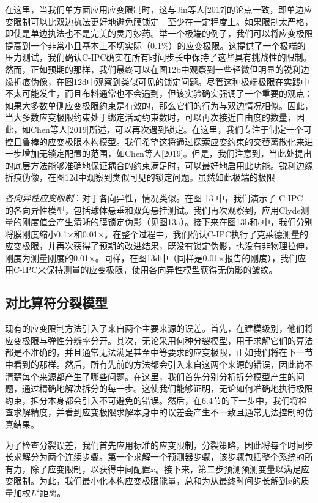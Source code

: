 在这里，当我们单方面应用应变限制时，这与Jin等人[2017]的论点一致，即单边应变限制可以比双边执法更好地避免膜锁定 - 至少在一定程度上。如果限制太严格，即使是单边执法也不是完美的灵丹妙药。举一个极端的例子，我们可以将应变极限提高到一个非常小且基本上不切实际（0.1\%）的应变极限。这提供了一个极端的压力测试，我们确认C-IPC确实在所有时间步长中保持了这些具有挑战性的限制。然而，正如预期的那样，我们最终可以在图12b中观察到一些轻微但明显的锐利边缘折痕伪像，在图12d中观察到类似可见的锁定问题。尽管这种极端极限在实践中不太可能发生，而且布料通常也不会遇到，但该实验确实强调了一个重要的观点：如果大多数单侧应变极限约束是有效的，那么它们的行为与双边情况相似。因此，当大多数应变极限约束处于绑定活动约束数时，可以再次接近自由度的数量，因此，如Chen等人[2019]所述，可以再次遇到锁定。在这里，我们专注于制定一个可控且鲁棒的应变极限本构模型。我们希望这将通过探索应变约束的交替离散化来进一步增加无锁定配置的范围，如Chen等人[2019]。但是，我们注意到，当此处提出的底层方法能够准确地保证耦合的约束满足时，可以最好地启用此功能。锐利边缘折痕伪像，在图12d中观察到类似可见的锁定问题。虽然如此极端的极限

\textit{各向异性应变限制}：对于各向异性，情况类似。在图 13 中，我们演示了 C-IPC 的各向异性模型，包括球体悬垂和双角悬挂测试。我们再次观察到，应用Clyde测量的刚度值会产生清晰的膜锁定伪影（见图13a）。接下来在图13b和c中，我们分别将膜刚度缩小0.1×和0.01×。在整个过程中，我们确认C-IPC执行了克莱德测量的应变极限，并再次获得了预期的改进结果，既没有锁定伪影，也没有非物理拉伸，刚度为测量刚度的0.01×。同样，在图13d中（同样是0.01×报告的刚度），我们应用C-IPC来保持测量的应变极限，使用各向异性模型获得无伪影的皱纹。

\subsection{对比算符分裂模型}

现有的应变限制方法引入了来自两个主要来源的误差。首先，在建模级别，他们将应变极限与弹性分辨率分开。其次，无论采用何种分裂模型，用于求解它们的算法都是不准确的，并且通常无法满足甚至中等要求的应变极限，正如我们将在下一节中看到的那样。然后，所有先前的方法都会引入来自这两个来源的错误，因此尚不清楚每个来源都产生了哪些问题。在这里，我们首先分别分析拆分模型产生的问题，通过精确地解决拆分的每一步。这使我们能够证明，无论如何准确地执行极限约束，拆分本身都会引入不可避免的错误。然后，在6.4节的下一步中，我们将检查求解精度，并看到应变极限求解本身中的误差会产生不一致且通常无法控制的仿真结果。

为了检查分裂误差，我们首先应用标准的应变限制，分裂策略，因此将每个时间步长求解分为两个连续步骤。第一个求解一个预测器步骤，该步骤包括整个系统的所有力，除了应变限制，以获得中间配置$\hat x$。接下来，第二步预测预测变量以满足应变限制。为此，我们最小化本构应变极限能量，总和为从最终时间步长解到$\hat x$的质量加权$L^2$距离。

